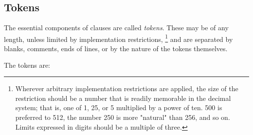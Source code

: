 \subsection{Tokens}\label{reftokens}
 The essential components of clauses are called \emph{tokens}.
These may be of any length, unless limited by implementation
restrictions,
\footnote{
Wherever arbitrary implementation restrictions are applied, the size of
the restriction should be a number that is readily memorable in the
decimal system; that is, one of 1, 25, or 5 multiplied by a power of
ten.
500 is preferred to 512, the number 250 is more "natural" than
256, and so on.  Limits expressed in digits should be a multiple of
three.
}
and are separated by blanks, comments, ends of lines, or by the nature
of the tokens themselves.
 
The tokens are:
